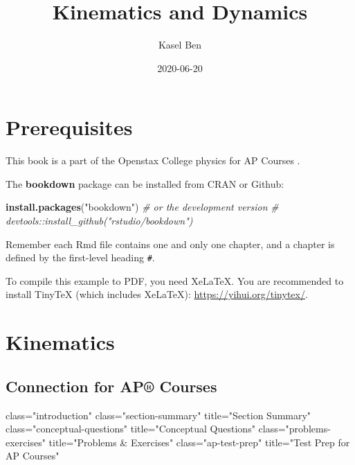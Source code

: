 \documentclass[
]{book}
\title{Kinematics and Dynamics}
\author{Kasel Ben}
\date{2020-06-20}
\newenvironment{Shaded}{\begin{snugshade}}{\end{snugshade}}
\newcommand{\CommentTok}[1]{\textcolor[rgb]{0.56,0.35,0.01}{\textit{#1}}}
\newcommand{\KeywordTok}[1]{\textcolor[rgb]{0.13,0.29,0.53}{\textbf{#1}}}
\newcommand{\NormalTok}[1]{#1}
\newcommand{\StringTok}[1]{\textcolor[rgb]{0.31,0.60,0.02}{#1}}
\begin{document}
\maketitle

{
\setcounter{tocdepth}{1}
\tableofcontents
}
\hypertarget{prerequisites}{%
\chapter{Prerequisites}\label{prerequisites}}

This book is a part of the Openstax College physics for AP Courses \citet{wolfe_college_2015} .

The \textbf{bookdown} package can be installed from CRAN or Github:

\begin{Shaded}
\begin{Highlighting}[]
\KeywordTok{install.packages}\NormalTok{(}\StringTok{"bookdown"}\NormalTok{)}
\CommentTok{\# or the development version}
\CommentTok{\# devtools::install\_github("rstudio/bookdown")}
\end{Highlighting}
\end{Shaded}

Remember each Rmd file contains one and only one chapter, and a chapter is defined by the first-level heading \texttt{\#}.

To compile this example to PDF, you need XeLaTeX. You are recommended to install TinyTeX (which includes XeLaTeX): \url{https://yihui.org/tinytex/}.

\hypertarget{kinematics}{%
\chapter{Kinematics}\label{kinematics}}

\hypertarget{connection-for-ap-courses}{%
\section{Connection for AP® Courses}\label{connection-for-ap-courses}}

class="introduction"
class="section-summary"
title="Section Summary"
class="conceptual-questions"
title="Conceptual Questions"
class="problems-exercises"
title="Problems \& Exercises"
class="ap-test-prep" title="Test
Prep for AP Courses"
\end{document}
